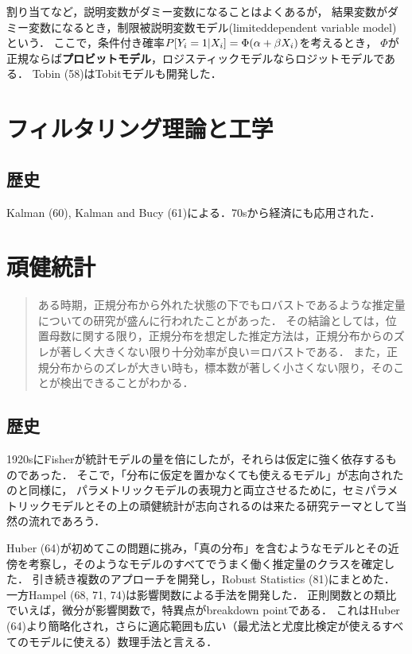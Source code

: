 \documentclass[uplatex,dvipdfmx]{jsreport}
\begin{document}
割り当てなど，説明変数がダミー変数になることはよくあるが，
結果変数がダミー変数になるとき，制限被説明変数モデル(limiteddependent variable model)という．
ここで，条件付き確率$P[Y_i=1|X_i]=\Phi(\alpha+\beta X_i)$を考えるとき，
$\Phi$が正規ならば\textbf{プロビットモデル}，ロジスティックモデルならロジットモデルである．
Tobin (58)はTobitモデルも開発した．

\chapter{フィルタリング理論と工学}

\section{歴史}

\begin{history}
    Kalman (60), Kalman and Bucy (61)による．70sから経済にも応用された．
\end{history}

\chapter{頑健統計}

\begin{quotation}
    ある時期，正規分布から外れた状態の下でもロバストであるような推定量についての研究が盛んに行われたことがあった．
    その結論としては，位置母数に関する限り，正規分布を想定した推定方法は，正規分布からのズレが著しく大きくない限り十分効率が良い＝ロバストである．
    また，正規分布からのズレが大きい時も，標本数が著しく小さくない限り，そのことが検出できることがわかる．
\end{quotation}

\section{歴史}

\begin{history}
    1920sにFisherが統計モデルの量を倍にしたが，それらは仮定に強く依存するものであった．
    そこで，「分布に仮定を置かなくても使えるモデル」が志向されたのと同様に，
    パラメトリックモデルの表現力と両立させるために，セミパラメトリックモデルとその上の頑健統計が志向されるのは来たる研究テーマとして当然の流れであろう．

    Huber (64)が初めてこの問題に挑み，「真の分布」を含むようなモデルとその近傍を考察し，そのようなモデルのすべてでうまく働く推定量のクラスを確定した．
    引き続き複数のアプローチを開発し，Robust Statistics (81)にまとめた．
    一方Hampel (68, 71, 74)は影響関数による手法を開発した．
    正則関数との類比でいえば，微分が影響関数で，特異点がbreakdown pointである．
    これはHuber (64)より簡略化され，さらに適応範囲も広い（最尤法と尤度比検定が使えるすべてのモデルに使える）数理手法と言える．
\end{history}
\end{document}
